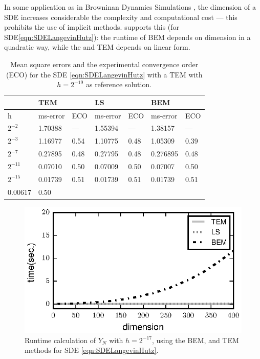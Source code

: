 	In some application as in Browninan Dynamics Simulations \cite{Cruz2012}, the dimension of a SDE
increases considerable the complexity and computational cost --- this prohibits the use of implicit methods.
 supports this (for SDE\eqref{eqn:SDELangevinHutz}): the runtime of BEM depends on 
dimension in a quadratic way, while the \SM and TEM depends on linear form.     
\begin{table}[t]
	\centering
	\begin{tabular}{lllllll}
		&        TEM &        	& LS		&           & BEM		 &         \\
		\toprule
		h		& ms-error	 & ECO 		& ms-error	    & ECO		& ms-error	 &	ECO	  \\
		\midrule
		$2^{-2}$	& \num{1.70388}    & ---		&\num{1.55394}		& ---		& \num{1.38157}	& 
		--- \\
		$2^{-3}$	& \num{1.16977}    & \num{0.54}     &\num{1.10775}    & \num{0.48} & \num{1.05309}	& 
		\num{0.39} \\ 
		$2^{-7}$	&\num{0.27895}     & \num{0.48} & \num{0.27795}   & \num{0.48} & \num{0.276895}& 
		\num{0.48} \\
			$2^{-11}$	& \num{0.07010}  & \num{0.50} & \num{0.07009}  & \num{0.50} & \num{0.07007} & 
		\num{0.50} \\
			$2^{-15}$	& \num{0.01739}  & \num{0.51} & \num{0.01739}  & \num{0.51} & \num{0.01739}& 
		\num{0.51} \\
		\num{0.00617}&\num{0.50} \\
		\bottomrule
	\end{tabular}
	\caption{
		Mean square errors and the experimental convergence order (ECO) for the SDE \eqref{eqn:SDELangevinHutz} with 
		a TEM with $h = 2^{-19}$ as reference solution.
	}\label{tbl:OrdersLS}
\end{table}
\begin{figure}[t]
	\centering
	\includegraphics{TimeVsDimension}
	\caption{
		Runtime calculation of $Y_N$ with $h=2^{-17}$, using the BEM,  \SM and TEM methods for 
		SDE \eqref{eqn:SDELangevinHutz}.
	}
	\label{fig:TimeVsDimension}
\end{figure}

